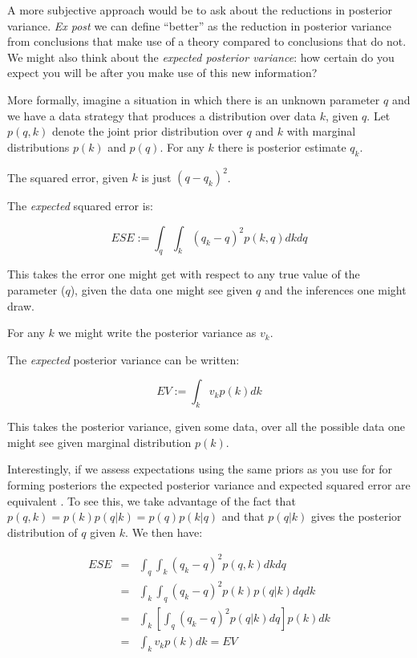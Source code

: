 \documentclass[
  12pt,
]{book}
\begin{document}
A more subjective approach would be to ask about the reductions in posterior variance. \emph{Ex post} we can define ``better'' as the reduction in posterior variance from conclusions that make use of a theory compared to conclusions that do not. We might also think about the \emph{expected posterior variance}: how certain do you expect you will be after you make use of this new information?

More formally, imagine a situation in which there is an unknown parameter \(q\) and we have a data strategy that produces a distribution over data \(k\), given \(q\). Let \(p(q,k)\) denote the joint prior distribution over \(q\) and \(k\) with marginal distributions \(p(k)\) and \(p(q)\). For any \(k\) there is posterior estimate \(q_k\).

The squared error, given \(k\) is just \((q - q_k)^2\).

The \emph{expected} squared error is:

\[ESE := \int_q\int_k \left({q}_k-q\right)^2p(k, q)dkdq \]

This takes the error one might get with respect to any true value of the parameter (\(q\)), given the data one might see given \(q\) and the inferences one might draw.

For any \(k\) we might write the posterior variance as \(v_k\).

The \emph{expected} posterior variance can be written:

\[EV := \int_k v_k p(k)dk\]

This takes the posterior variance, given some data, over all the possible data one might see given marginal distribution \(p(k)\).

Interestingly, if we assess expectations using the same priors as you use for for forming posteriors the expected posterior variance and expected squared error are equivalent \citep{scharf1991statistical}.
To see this, we take advantage of the fact that \(p(q,k) = p(k)p(q|k) = p(q)p(k|q)\) and that \(p(q|k)\) gives the posterior distribution of \(q\) given \(k\). We then have:

\begin{eqnarray}
ESE &=& \int_q\int_k \left({q}_k-q\right)^2p(q,k)dkdq \\
    &=& \int_k\int_q \left({q}_k-q\right)^2p(k)p(q|k)dq dk \\
    &=& \int_k\left[\int_q \left({q}_k-q\right)^2p(q|k)dq\right]p(k)dk \\
    &=& \int_k v_k p(k)dk  = EV
\end{eqnarray}
\end{document}
